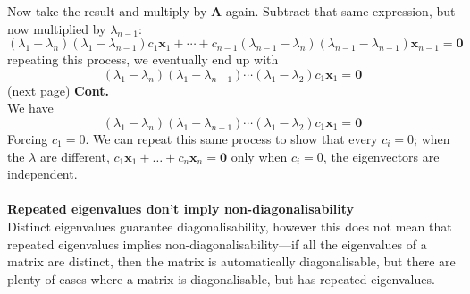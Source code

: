 \documentclass{report}
\begin{document}
Now take the result and multiply by $\bm A$ again. Subtract that same expression, but now multiplied by $\lambda_{n-1}$:
\begin{equation*}
(\lambda_1-\lambda_n)(\lambda_1-\lambda_{n-1})c_1\bm x_1+\cdots+c_{n-1}(\lambda_{n-1}-\lambda_n)(\lambda_{n-1}-\lambda_{n-1})\bm x_{n-1}=\bm 0
\end{equation*}
repeating this process, we eventually end up with
\begin{equation*}
(\lambda_1-\lambda_n)(\lambda_1-\lambda_{n-1})\cdots(\lambda_1-\lambda_2)c_1\bm x_1=\bm 0
\end{equation*}
(next page)\newpage
\noindent\textbf{Cont.}\\
We have
\begin{equation*}
(\lambda_1-\lambda_n)(\lambda_1-\lambda_{n-1})\cdots(\lambda_1-\lambda_2)c_1\bm x_1=\bm 0
\end{equation*}
Forcing $c_1=0$. We can repeat this same process to show that every $c_i=0$; when the $\lambda$ are different, $c_1\bm x_1+\ldots+c_n\bm x_n=\bm 0$ only when $c_i=0$, the 
eigenvectors are independent.\\
\vspace{1mm}\\
\textbf{Repeated eigenvalues don't imply non-diagonalisability}\\
Distinct eigenvalues guarantee diagonalisability, however this does not mean that repeated eigenvalues implies non-diagonalisability---if all the eigenvalues of a matrix are
distinct, then the matrix is automatically diagonalisable, but there are plenty of cases where a matrix is diagonalisable, but has repeated eigenvalues.
\newpage
\end{document}

